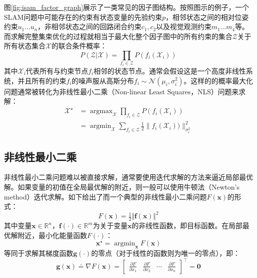 图\ref{fig:isam_factor_graph}展示了一类常见的因子图结构。按照图示的例子，一个SLAM问题中可能存在的约束有状态变量的先验约束$p$，相邻状态之间的相对位姿约束$u_1 \dots u_n$，非相邻状态之间的回路闭合约束$c_1,c_2$以及视觉观测约束$m_1 \dots m_4$等。而求解完整集束优化的过程就相当于最大化整个因子图中的所有约束的集合$\mathcal{Z}$关于所有状态集合$\mathcal{X}$的联合条件概率：
\begin{equation}
    P(\mathcal{Z}|\mathcal{X}) = \prod_{f_i\in\mathcal{Z}} P(f_i(\mathcal{X}_i))
\end{equation}
其中$\mathcal{X}_i$代表所有与约束节点$f_i$相邻的状态节点。通常会假设这是一个高度非线性系统，并且所有的约束$f_i$的噪声服从高斯分布$f_i\sim\mathcal{N}(\mu_i, \sigma_i^2)$。这样的的概率最大化问题通常被转化为非线性最小二乘（Non-linear Least Squares，NLS）问题来求解：
\begin{equation}
\begin{aligned}
    \mathcal{X}^\star &= \mathop{\arg\max}_{\mathcal{X}}
                         \prod_{f_i\in\mathcal{Z}} P(f_i(\mathcal{X}_i)) \\
                      &= \mathop{\arg\min}_{\mathcal{X}}
                         \sum_{f_i\in\mathcal{Z}} \tfrac{1}{2}
                         \lVert f_i(\mathcal{X}_i)) \rVert_{\sigma_i^2}^2
\end{aligned}
\end{equation}

\subsection{非线性最小二乘}

非线性最小二乘问题难以被直接求解，通常要使用迭代求解的方法来逼近局部最优解。如果变量的初值在全局最优解的附近，则一般可以使用牛顿法（Newton's method）迭代求解。如下给出了而一个典型的非线性最小二乘问题$F(\bm{x})$的形式：
\begin{equation}
    F(\bm{x}) = \tfrac{1}{2} \Vert \bm{f}(\bm{x}) \Vert^2
\label{eq:nls}
\end{equation}
其中变量$\bm{x}\in\mathbb{R}^n$，$\bm{f}(\cdot)\in\mathbb{R}^m$为关于变量$\bm{x}$的非线性函数，即目标函数。在局部最优解附近，最小化能量函数$F(\cdot)$：
\begin{equation}
    \bm{x}^\star = \mathop{\arg\min}_{\bm{x}} F(\bm{x}) 
\end{equation}
等同于求解其梯度函数$\bm{g}(\cdot)$的零点（对于线性的函数则为唯一的零点），即：
\begin{equation}
    \bm{g}(\bm{x}) \doteq \nabla F(\bm{x}) = \begin{bmatrix}
        \frac{\partial F}{\partial x_1} &
        \frac{\partial F}{\partial x_2} &
        \cdots &
        \frac{\partial F}{\partial x_n}
    \end{bmatrix}^\top = \bm{0}
\end{equation}

